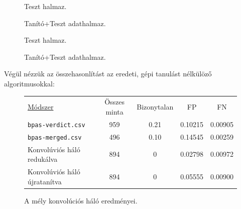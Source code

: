 \begin{figure}[ht]
	
	
	\begin{minipage}[c]{0.5\linewidth}
		
		\caption{Teszt halmaz.}
		\label{fig:roc-test-re}
		
	\end{minipage}\hfill
	\begin{minipage}[c]{0.5\linewidth}
		
		\caption{Tanító+Teszt adathalmaz.}
		\label{fig:roc-full-re}
		
	\end{minipage}
	\label{fig:ujratanitott.feladat}
\end{figure}



\begin{figure}[ht]
	
	
	\begin{minipage}[c]{0.5\linewidth}
		
		\caption{Teszt halmaz.}
		\label{fig:hist-test}
		
	\end{minipage}\hfill
	\begin{minipage}[c]{0.5\linewidth}
		
		\caption{Tanító+Teszt adathalmaz.}\label{fig:hist-full}
		
	\end{minipage}
	\label{fig:histogram-ujratanitott}
\end{figure}


Végül nézzük az összehasonlítást az eredeti, gépi tanulást nélkülöző algoritmusokkal:

\begin{figure} [h!]
	\centering
	\begin{tabular}{ l c c c c  }
		\underline{Módszer} 			& Összes minta 	& Bizonytalan	& FP	& FN \\
		\texttt{bpas-verdict.csv}\footnotemark 	& 959 			& 0.21			& 0.10215 	& 0.00905 	\\
		\texttt{bpas-merged.csv}\footnotemark[\value{footnote}]  	& 496			& 0.10			& 0.14545 	& 0.00259   \\
		
		\hline
		Konvolúviós háló redukálva\footnotemark 	& 894			& 0				& 0.02798	& 0.00972	\\
		Konvolúviós háló újratanítva& 894			& 0				& 0.05555	& 0.00900	\\
		
		
	\end{tabular} 

	\caption{A mély konvolúciós háló eredményei.}
\end{figure}

